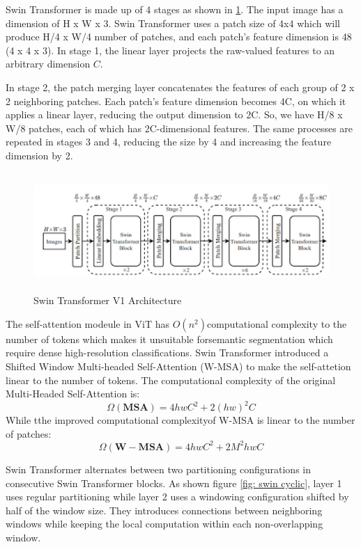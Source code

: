 Swin Transformer is made up of 4 stages as shown in \ref{fig:swin architecture1}. The input image has a dimension of H x W x 3. Swin Transformer uses a patch size of 4x4 which will produce H/4 x W/4 number of patches, and each patch’s feature dimension is 48 (4 x 4 x 3). In stage 1, the linear layer projects the raw-valued features to an arbitrary dimension $C$.

In stage 2, the patch merging layer concatenates the features of each group of 2 x 2 neighboring patches. Each patch’s feature dimension becomes 4C, on which it applies a linear layer, reducing the output dimension to 2C. So, we have H/8 x W/8 patches, each of which has 2C-dimensional features. The same processes are repeated in stages 3 and 4, reducing the size by 4 and increasing the feature dimension by 2.

\FloatBarrier
\begin{figure}[ht]
\includegraphics[width=11.5cm, height=4.5cm]{images/swin-transformer-4block.png}
\centering
\caption{Swin Transformer V1 Architecture}
\label{fig:swin architecture1}
\end{figure}

The self-attention modeule in ViT has $O(n^2) $computational complexity to the number of tokens which makes it unsuitable forsemantic segmentation which require dense high-resolution classifications. Swin Transformer introduced a Shifted Window Multi-headed Self-Attention (W-MSA) to make the self-attetion linear to the number of tokens. The computational complexity of the original Multi-Headed Self-Attention is:
\begin{equation}
    \Omega (\mathbf{MSA}) = 4hwC^2 + 2(hw)^2C
\end{equation}
While tthe improved computational complexityof W-MSA is linear to the number of patches:
\begin{equation}
    \Omega (\mathbf{W-MSA}) = 4hwC^2 + 2M^2hwC
\end{equation}

Swin Transformer alternates between two partitioning configurations in consecutive Swin Transformer blocks. As shown figure \ref{fig: swin cyclic}, layer 1 uses regular partitioning while layer 2 uses a windowing configuration shifted by half of the window size. They introduces connections between neighboring windows while keeping the local computation within each non-overlapping window.

